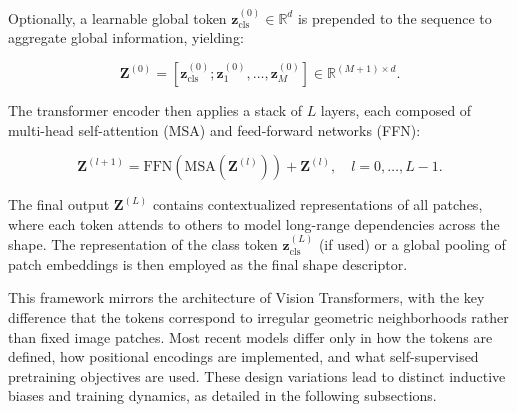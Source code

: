 Optionally, a learnable global token $\mathbf{z}_{\text{cls}}^{(0)} \in \mathbb{R}^{d}$ is prepended to the sequence to aggregate global information, yielding:

\begin{equation}
  \mathbf{Z}^{(0)} = [\mathbf{z}_{\text{cls}}^{(0)}; \mathbf{z}_1^{(0)}, \dots, \mathbf{z}_M^{(0)}] \in \mathbb{R}^{(M+1) \times d}.
\end{equation}

The transformer encoder then applies a stack of $L$ layers, each composed of multi-head self-attention (MSA) and feed-forward networks (FFN):

\begin{equation}
  \mathbf{Z}^{(l+1)} = \text{FFN}(\text{MSA}(\mathbf{Z}^{(l)})) + \mathbf{Z}^{(l)}, \quad l=0,\dots,L-1.
\end{equation}

The final output $\mathbf{Z}^{(L)}$ contains contextualized representations of all patches, where each token attends to others to model long-range dependencies across the shape. The representation of the class token $\mathbf{z}_{\text{cls}}^{(L)}$ (if used) or a global pooling of patch embeddings is then employed as the final shape descriptor.

This framework mirrors the architecture of Vision Transformers, with the key difference that the tokens correspond to irregular geometric neighborhoods rather than fixed image patches. Most recent models differ only in how the tokens are defined, how positional encodings are implemented, and what self-supervised pretraining objectives are used. These design variations lead to distinct inductive biases and training dynamics, as detailed in the following subsections.


